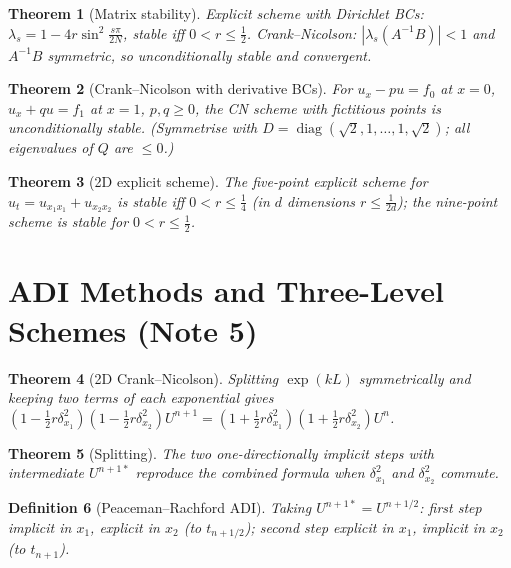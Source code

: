 \documentclass[10pt,a4paper]{article}
\theoremstyle{tight}
\newtheorem{theorem}{Theorem}[section]
\newtheorem{definition}[theorem]{Definition}
\begin{document}
\begin{theorem}[Matrix stability]
Explicit scheme with Dirichlet BCs: \(\lambda_s=1-4r\sin^2\frac{s\pi}{2N}\), stable iff \(0<r\le\frac12\).
Crank--Nicolson: \(|\lambda_s(A^{-1}B)|<1\) and \(A^{-1}B\) symmetric, so unconditionally stable and convergent.
\end{theorem}

\begin{theorem}[Crank--Nicolson with derivative BCs]
For \(u_x-pu=f_0\) at \(x=0\), \(u_x+qu=f_1\) at \(x=1\), \(p,q\ge0\), the CN scheme with fictitious
points is unconditionally stable. (Symmetrise with \(D=\operatorname{diag}(\sqrt2,1,\dots,1,\sqrt2)\);
all eigenvalues of \(Q\) are \(\le0\).)
\end{theorem}

\begin{theorem}[2D explicit scheme]
The five-point explicit scheme for \(u_t=u_{x_1x_1}+u_{x_2x_2}\) is stable iff \(0<r\le\frac14\)
(in \(d\) dimensions \(r\le\frac1{2d}\)); the nine-point scheme is stable for \(0<r\le\frac12\).
\end{theorem}

\section{ADI Methods and Three-Level Schemes (Note 5)}

\begin{theorem}[2D Crank--Nicolson]
Splitting \(\exp(kL)\) symmetrically and keeping two terms of each exponential gives
\((1-\frac12r\delta_{x_1}^2)(1-\frac12r\delta_{x_2}^2)U^{n+1}=(1+\frac12r\delta_{x_1}^2)(1+\frac12r\delta_{x_2}^2)U^n\).
\end{theorem}

\begin{theorem}[Splitting]
The two one-directionally implicit steps with intermediate \(U^{n+1*}\) reproduce the combined
formula when \(\delta_{x_1}^2\) and \(\delta_{x_2}^2\) commute.
\end{theorem}

\begin{definition}[Peaceman--Rachford ADI]
Taking \(U^{n+1*}=U^{n+1/2}\): first step implicit in \(x_1\), explicit in \(x_2\) (to \(t_{n+1/2}\));
second step explicit in \(x_1\), implicit in \(x_2\) (to \(t_{n+1}\)).
\end{definition}
\end{document}

